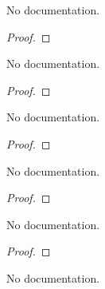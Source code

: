\begin{theorem}\label{HasGradientAt.const_add}
        \leanok
                No documentation.
    \end{theorem}

\begin{proof}
    \leanok
\end{proof}

\begin{theorem}\label{Gradient_const_add}
        \leanok
                No documentation.
    \end{theorem}

\begin{proof}
    \leanok
\end{proof}

\begin{theorem}\label{HasGradientAtFilter.sum}
        \leanok
                No documentation.
    \end{theorem}

\begin{proof}
    \leanok
\end{proof}

\begin{theorem}\label{HasGradientWithinAt.sum}
        \leanok
                No documentation.
    \end{theorem}

\begin{proof}
    \leanok
\end{proof}

\begin{theorem}\label{HasGradientAt.sum}
        \leanok
                No documentation.
    \end{theorem}

\begin{proof}
    \leanok
\end{proof}

\begin{theorem}\label{gradient_sum}
        \leanok
                No documentation.
    \end{theorem}


